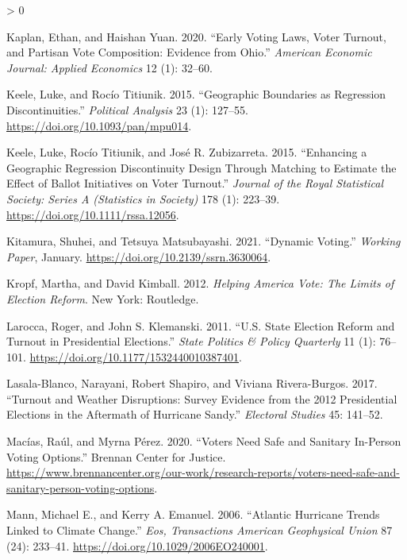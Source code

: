 \documentclass[
  12pt,
]{article}
\newlength{\cslhangindent}
\newenvironment{CSLReferences}[2] %
 {%
  \setlength{\parindent}{0pt}
  \ifodd #1 \everypar{\setlength{\hangindent}{\cslhangindent}}\ignorespaces\fi
  \ifnum #2 > 0
  \setlength{\parskip}{#2\baselineskip}
  \fi
 }%
 {}
\begin{document}
\begin{CSLReferences}{1}{0}
\leavevmode\hypertarget{ref-Kaplan2020}{}%
Kaplan, Ethan, and Haishan Yuan. 2020. {``Early {Voting Laws}, {Voter Turnout}, and {Partisan Vote Composition}: {Evidence} from {Ohio}.''} \emph{American Economic Journal: Applied Economics} 12 (1): 32--60.

\leavevmode\hypertarget{ref-Keele2015}{}%
Keele, Luke, and Rocío Titiunik. 2015. {``Geographic {Boundaries} as {Regression Discontinuities}.''} \emph{Political Analysis} 23 (1): 127--55. \url{https://doi.org/10.1093/pan/mpu014}.

\leavevmode\hypertarget{ref-Keele2015a}{}%
Keele, Luke, Rocío Titiunik, and José R. Zubizarreta. 2015. {``Enhancing a Geographic Regression Discontinuity Design Through Matching to Estimate the Effect of Ballot Initiatives on Voter Turnout.''} \emph{Journal of the Royal Statistical Society: Series A (Statistics in Society)} 178 (1): 223--39. \url{https://doi.org/10.1111/rssa.12056}.

\leavevmode\hypertarget{ref-Kitamura2021}{}%
Kitamura, Shuhei, and Tetsuya Matsubayashi. 2021. {``Dynamic {Voting}.''} \emph{Working Paper}, January. \url{https://doi.org/10.2139/ssrn.3630064}.

\leavevmode\hypertarget{ref-Kropf2012}{}%
Kropf, Martha, and David Kimball. 2012. \emph{Helping {America Vote}: {The Limits} of {Election Reform}}. {New York}: {Routledge}.

\leavevmode\hypertarget{ref-Larocca2011}{}%
Larocca, Roger, and John S. Klemanski. 2011. {``U.{S}. {State Election Reform} and {Turnout} in {Presidential Elections}.''} \emph{State Politics \& Policy Quarterly} 11 (1): 76--101. \url{https://doi.org/10.1177/1532440010387401}.

\leavevmode\hypertarget{ref-Lasala-Blanco2017}{}%
Lasala-Blanco, Narayani, Robert Shapiro, and Viviana Rivera-Burgos. 2017. {``Turnout and {Weather Disruptions}: {Survey Evidence} from the 2012 {Presidential Elections} in the {Aftermath} of {Hurricane Sandy}.''} \emph{Electoral Studies} 45: 141--52.

\leavevmode\hypertarget{ref-Macias2020}{}%
Macías, Raúl, and Myrna Pérez. 2020. {``Voters {Need Safe} and {Sanitary In-Person Voting Options}.''} {Brennan Center for Justice}. \url{https://www.brennancenter.org/our-work/research-reports/voters-need-safe-and-sanitary-person-voting-options}.

\leavevmode\hypertarget{ref-Mann2006}{}%
Mann, Michael E., and Kerry A. Emanuel. 2006. {``Atlantic Hurricane Trends Linked to Climate Change.''} \emph{Eos, Transactions American Geophysical Union} 87 (24): 233--41. \url{https://doi.org/10.1029/2006EO240001}.


\end{CSLReferences}
\end{document}
